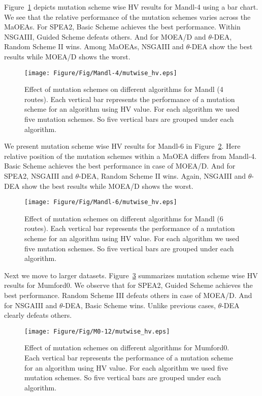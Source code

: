 Figure~\ref{fig:mandl4_mutwise_hv} depicts mutation scheme wise HV results for Mandl-4 using a bar chart. We see that the relative performance of the mutation schemes varies across the MaOEAs. For SPEA2, Basic Scheme achieves the best performance. Within NSGAIII, Guided Scheme defeats others. And for MOEA/D and $\theta$-DEA, Random Scheme II wins. Among MaOEAs, NSGAIII and $\theta$-DEA show the best results while MOEA/D shows the worst.  

\begin{figure} [!htbp]
	\centering
	\texttt{[image: Figure/Fig/Mandl-4/mutwise\_hv.eps]}
	\caption{Effect of mutation schemes on different algorithms for Mandl (4 routes). Each vertical bar represents the performance of a mutation scheme for an algorithm using HV value. For each algorithm we used five mutation schemes. So five vertical bars are grouped under each algorithm.}\label{fig:mandl4_mutwise_hv} 
\end{figure}

We present mutation scheme wise HV results for Mandl-6 in Figure~\ref{fig:mandl6_mutwise_hv}. Here relative position of the mutation schemes within a MaOEA differs from Mandl-4. Basic Scheme achieves the best performance in case of MOEA/D. And for SPEA2, NSGAIII and $\theta$-DEA, Random Scheme II wins. Again, NSGAIII and $\theta$-DEA show the best results while MOEA/D shows the worst.  

\begin{figure} [!htbp]
	\centering
	\texttt{[image: Figure/Fig/Mandl-6/mutwise\_hv.eps]}
	\caption{Effect of mutation schemes on different algorithms for Mandl (6 routes). Each vertical bar represents the performance of a mutation scheme for an algorithm using HV value. For each algorithm we used five mutation schemes. So five vertical bars are grouped under each algorithm.}\label{fig:mandl6_mutwise_hv} 
\end{figure}

Next we move to larger datasets. Figure~\ref{fig:m0_mutwise_hv} summarizes mutation scheme wise HV results for Mumford0. We observe that for SPEA2, Guided Scheme achieves the best performance. Random Scheme III defeats others in case of MOEA/D. And for NSGAIII and $\theta$-DEA, Basic Scheme wins. Unlike previous cases, $\theta$-DEA clearly defeats others.  

\begin{figure} [!htbp]
	\centering
	\texttt{[image: Figure/Fig/M0-12/mutwise\_hv.eps]}
	\caption{Effect of mutation schemes on different algorithms for Mumford0. Each vertical bar represents the performance of a mutation scheme for an algorithm using HV value. For each algorithm we used five mutation schemes. So five vertical bars are grouped under each algorithm.}\label{fig:m0_mutwise_hv} 
\end{figure}

